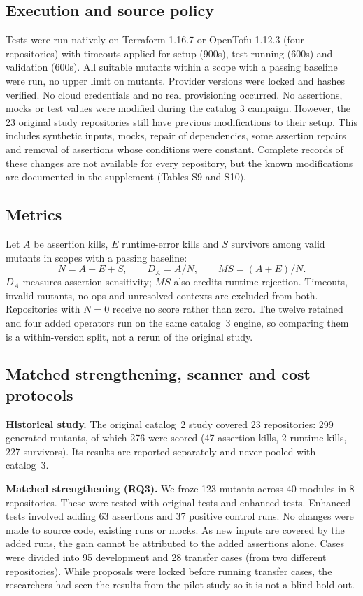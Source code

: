 \documentclass[3p,times,procedia]{elsarticle}
\begin{document}
\subsection{Execution and source policy}\label{sec:adaptation}
Tests were run natively on Terraform 1.16.7 or OpenTofu 1.12.3 (four repositories) with timeouts
applied for setup (900s), test-running (600s) and validation (600s). All suitable mutants within a scope with a
passing baseline were run, no upper limit on mutants. Provider versions were locked and hashes verified. No
cloud credentials and no real provisioning occurred. No assertions, mocks or test values were modified during
the catalog 3 campaign. However, the 23 original study repositories still have previous modifications to their
setup. This includes synthetic inputs, mocks, repair of dependencies, some assertion repairs and removal of assertions whose conditions were constant. Complete records of these changes are not available for every repository, but the known modifications are documented in the supplement
 (Tables S9 and S10).

\subsection{Metrics}\label{sec:metrics}
Let $A$ be assertion kills, $E$ runtime-error kills and $S$ survivors among valid mutants in scopes with a passing baseline:
\begin{equation}
N=A+E+S,\qquad D_A=A/N,\qquad MS=(A+E)/N.\label{eq:score}
\end{equation}
$D_A$ measures assertion sensitivity; $MS$ also credits runtime rejection. Timeouts, invalid mutants, no-ops and unresolved contexts are excluded from both. Repositories with $N=0$ receive no score rather than zero. The twelve retained and four added operators run on the same catalog~3 engine, so comparing them is a within-version split, not a rerun of the original study.

\subsection{Matched strengthening, scanner and cost protocols}\label{sec:paired}
\textbf{Historical study.} The original catalog~2 study covered 23 repositories: 299 generated mutants, of which 276 were scored (47 assertion kills, 2 runtime kills, 227 survivors). Its results are reported separately and never pooled with catalog~3.

\textbf{Matched strengthening (RQ3).} We froze 123 mutants across 40 modules in 8 repositories. These were tested with
original tests and enhanced tests. Enhanced tests involved adding 63 assertions and 37 positive control runs.
No changes were made to source code, existing runs or mocks. As new inputs are covered by the added runs, the gain cannot be attributed to the added assertions alone. Cases were divided into 95 development and 28 transfer cases (from two different
repositories). While proposals were locked before running transfer cases, the researchers had seen the results from the pilot study so it is not a blind hold out.
\end{document}
